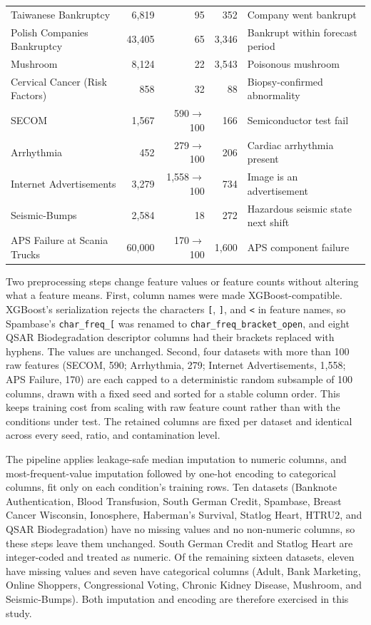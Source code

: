 \begin{table}[t]
\begin{tabular}{@{}lrrrl@{}}
Taiwanese Bankruptcy\cite{uci2020taiwanbankruptcy} & 6{,}819  & 95 & 352    & Company went bankrupt \\
Polish Companies Bankruptcy\cite{tomczak2016polishbankruptcy} & 43{,}405 & 65 & 3{,}346  & Bankrupt within forecast period \\
Mushroom\cite{uci1981mushroom} & 8{,}124  & 22 & 3{,}543  & Poisonous mushroom \\
Cervical Cancer (Risk Factors)\cite{fernandes2017cervical} & 858     & 32 & 88     & Biopsy-confirmed abnormality \\
SECOM\cite{mccann2008secom} & 1{,}567  & 590$\to$100 & 166 & Semiconductor test fail \\
Arrhythmia\cite{guvenir1997arrhythmia} & 452     & 279$\to$100 & 206 & Cardiac arrhythmia present \\
Internet Advertisements\cite{kushmerick1999internetads} & 3{,}279  & 1{,}558$\to$100 & 734 & Image is an advertisement \\
Seismic-Bumps\cite{sikora2010seismic} & 2{,}584  & 18 & 272    & Hazardous seismic state next shift \\
APS Failure at Scania Trucks\cite{scania2016apsfailure} & 60{,}000 & 170$\to$100 & 1{,}600 & APS component failure \\
\bottomrule
\end{tabular}
\end{table}

Two preprocessing steps change feature values or feature counts without altering what a feature means. First, column names were made XGBoost-compatible. XGBoost's serialization rejects the characters \texttt{[}, \texttt{]}, and \texttt{<} in feature names, so Spambase's \texttt{char\_freq\_[} was renamed to \texttt{char\_freq\_bracket\_open}, and eight QSAR Biodegradation descriptor columns had their brackets replaced with hyphens. The values are unchanged. Second, four datasets with more than 100 raw features (SECOM, 590; Arrhythmia, 279; Internet Advertisements, 1{,}558; APS Failure, 170) are each capped to a deterministic random subsample of 100 columns, drawn with a fixed seed and sorted for a stable column order. This keeps training cost from scaling with raw feature count rather than with the conditions under test. The retained columns are fixed per dataset and identical across every seed, ratio, and contamination level.

The pipeline applies leakage-safe median imputation to numeric columns, and most-frequent-value imputation followed by one-hot encoding to categorical columns, fit only on each condition's training rows. Ten datasets (Banknote Authentication, Blood Transfusion, South German Credit, Spambase, Breast Cancer Wisconsin, Ionosphere, Haberman's Survival, Statlog Heart, HTRU2, and QSAR Biodegradation) have no missing values and no non-numeric columns, so these steps leave them unchanged. South German Credit and Statlog Heart are integer-coded and treated as numeric. Of the remaining sixteen datasets, eleven have missing values and seven have categorical columns (Adult, Bank Marketing, Online Shoppers, Congressional Voting, Chronic Kidney Disease, Mushroom, and Seismic-Bumps). Both imputation and encoding are therefore exercised in this study.

